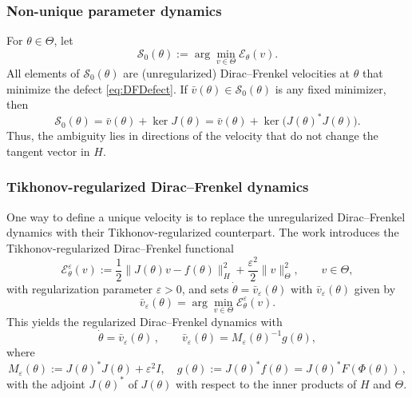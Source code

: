 \documentclass[oneside,11pt]{article}
\theoremstyle{remark}
\theoremstyle{thmstyleone}
\theoremstyle{thmstylethree}
\theoremstyle{thmstyletwo}
\newcommand{\norm}[1]{\lVert #1\rVert}
\newcommand{\mcE}{\mathcal{E}}
\newcommand{\mcS}{\mathcal{S}}
\begin{document}
\subsubsection{Non-unique parameter dynamics}
For $\theta\in \Theta$, let
        \begin{equation}
          \mcS_0(\theta):=\arg\min_{v\in \Theta}\mathcal{E}_\theta(v).
          \label{eq:S0_def}
        \end{equation}
        All elements of $\mcS_0(\theta)$ are (unregularized) Dirac--Frenkel velocities at $\theta$ that minimize the defect \eqref{eq:DFDefect}. If $\bar v(\theta)\in\mcS_0(\theta)$ is any fixed minimizer, then
        \begin{equation}
          \mcS_0(\theta)=\bar v(\theta)+\ker J(\theta)=\bar v(\theta)+\ker\bigl(J(\theta)^*J(\theta)\bigr).
          \label{eq:gauge_freedom}
        \end{equation}
        Thus, the ambiguity lies  in  directions of the velocity that do not change the tangent vector in $H$.
       


 
  \subsubsection{Tikhonov-regularized Dirac--Frenkel dynamics} One way to define a unique velocity is to replace the unregularized Dirac--Frenkel dynamics with their Tikhonov-regularized counterpart. The work \cite{Feischl2024}  introduces the Tikhonov-regularized Dirac--Frenkel functional
        \begin{equation}
          \mcE_\theta^\varepsilon(v) :=\frac12\norm{J(\theta)v-f(\theta)}_H^2+\frac{\varepsilon^2}{2}\norm{v}_\Theta^2,
          \qquad v\in \Theta,
          \label{eq:Etheta}
        \end{equation}
        with regularization parameter $\varepsilon>0$, and sets $\dot{\theta} = \bar{v}_{\varepsilon}(\theta)$ with $\bar{v}_{\varepsilon}(\theta)$ given by 
        \begin{equation}
          \bar{v}_{\varepsilon}(\theta) =\arg\min_{v\in \Theta}\mcE_{\theta}^\varepsilon(v).\label{eq:TDFVelocity}
        \end{equation}
  This yields the regularized Dirac--Frenkel dynamics with 
        \begin{equation}
          \dot{\theta} = \bar{v}_{\varepsilon}(\theta)\,,\qquad \bar{v}_{\varepsilon}(\theta) =M_{\varepsilon}(\theta)^{-1}g(\theta),
          \label{eq:continuous_df_eps}
        \end{equation}
        where
        \begin{equation}
          M_{\varepsilon}(\theta):=J(\theta)^*J(\theta)+\varepsilon^2 I,
          \quad g(\theta):=J(\theta)^*f(\theta)=J(\theta)^*F(\Phi(\theta))\,,
          \label{eq:M_eps_and_force_map}
        \end{equation}
with the adjoint $J(\theta)^*$ of $J(\theta)$ with respect to the inner products of $H$ and $\Theta$. 
\end{document}
